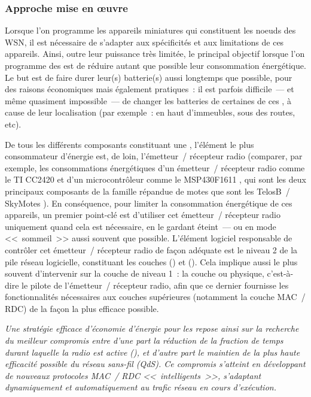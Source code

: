 \subsubsection{Approche mise en {\oe}uvre}
\label{ParApproche}

Lorsque l'on programme les appareils miniatures qui constituent les
noeuds des WSN, il est nécessaire de s'adapter aux spécificités et aux
limitations de ces appareils. Ainsi, outre leur puissance très limitée,
le principal objectif lorsque l'on programme des  est de
réduire autant que possible leur consommation énergétique. Le but
est de faire durer leur(s) batterie(s) aussi longtemps que possible,
pour des raisons économiques mais également pratiques~: il est parfois
difficile~--- et même quasiment impossible~--- de changer les batteries
de certaines de ces , à cause de leur localisation
(par exemple~: en haut d'immeubles, sous des routes, etc).

De tous les différents composants constituant une , l'élément
le plus consommateur d'énergie est, de loin, l'émetteur~/ récepteur
radio (comparer, par exemple, les consommations énergétiques d'un émetteur~/
récepteur radio comme le TI CC2420 \cite{DSCC2420} et d'un microcontrôleur
comme le MSP430F1611 \cite{DSMSP430F1611}, qui sont les deux principaux
composants de la famille répandue de motes que sont les TelosB~/ SkyMotes
\cite{DSTelosB}). En conséquence, pour limiter la consommation énergétique
de ces appareils, un premier point-clé est d'utiliser cet émetteur~/
récepteur radio uniquement quand cela est nécessaire, en le gardant
éteint~--- ou en mode <<~sommeil~>> aussi souvent que possible.
L'élément logiciel responsable de contrôler cet émetteur~/ récepteur
radio de façon adéquate est le niveau 2 de la pile réseau logicielle,
constituant les couches  () et
 (). Cela implique aussi le plus
souvent d'intervenir sur la couche de niveau 1~: la couche 
ou physique, c'est-à-dire le pilote de l'émetteur~/ récepteur radio,
afin que ce dernier fournisse les fonctionnalités nécessaires aux
couches supérieures (notamment la couche MAC~/ RDC) de la façon
la plus efficace possible.

\emph{Une stratégie efficace d'économie d'énergie pour les 
repose ainsi sur la recherche du meilleur compromis entre d'une part
la réduction de la fraction de temps durant laquelle la radio est active
(), et d'autre part le maintien de la plus haute
efficacité possible du réseau sans-fil (QdS). Ce compromis s'atteint
en développant de nouveaux protocoles MAC~/ RDC <<~intelligents~>>,
s'adaptant dynamiquement et automatiquement au trafic réseau en cours
d'exécution.}


